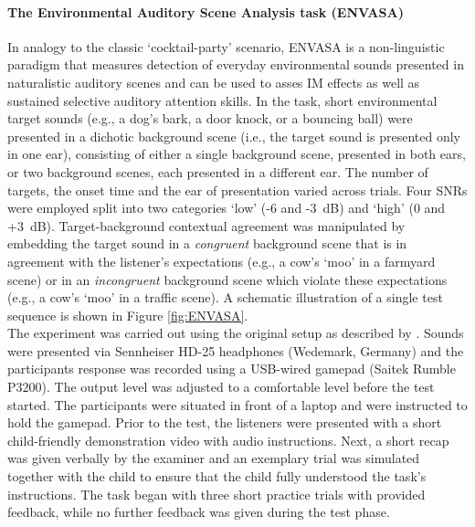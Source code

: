 \documentclass[a4paper, twoside]{templates/ociamthesis}
\begin{document}
\hypertarget{the-environmental-auditory-scene-analysis-task-envasa}{%
\paragraph{The Environmental Auditory Scene Analysis task (ENVASA)}\label{the-environmental-auditory-scene-analysis-task-envasa}}

\hfill\break
In analogy to the classic `cocktail-party' scenario, ENVASA is a non-linguistic paradigm \autocite{Leech2009} that measures detection of everyday environmental sounds presented in naturalistic auditory scenes and can be used to asses IM effects as well as sustained selective auditory attention skills. In the task, short environmental target sounds (e.g., a dog's bark, a door knock, or a bouncing ball) were presented in a dichotic background scene (i.e., the target sound is presented only in one ear), consisting of either a single background scene, presented in both ears, or two background scenes, each presented in a different ear. The number of targets, the onset time and the ear of presentation varied across trials. Four SNRs were employed split into two categories `low' (-6 and -3~dB) and `high' (0 and +3~dB). Target-background contextual agreement was manipulated by embedding the target sound in a \emph{congruent} background scene that is in agreement with the listener's expectations (e.g., a cow's `moo' in a farmyard scene) or in an \emph{incongruent} background scene which violate these expectations (e.g., a cow's `moo' in a traffic scene). A schematic illustration of a single test sequence is shown in Figure \ref{fig:ENVASA}.\\

The experiment was carried out using the original setup as described by \textcite{Leech2009}. Sounds were presented via Sennheiser HD-25 headphones (Wedemark, Germany) and the participants response was recorded using a USB-wired gamepad (Saitek Rumble P3200). The output level was adjusted to a comfortable level before the test started. The participants were situated in front of a laptop and were instructed to hold the gamepad. Prior to the test, the listeners were presented with a short child-friendly demonstration video with audio instructions. Next, a short recap was given verbally by the examiner and an exemplary trial was simulated together with the child to ensure that the child fully understood the task's instructions. The task began with three short practice trials with provided feedback, while no further feedback was given during the test phase.\\
\end{document}
